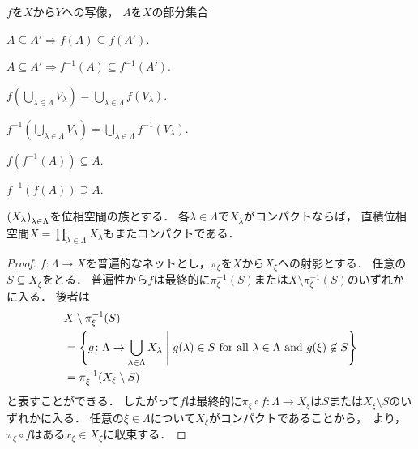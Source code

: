 \documentclass{ltjsbook}
\begin{document}
\begin{thmbox}
\begin{proposition}
\(f\)を\(X\)から\(Y\)への写像，
\(A\)を\(X\)の部分集合
\begin{conditions}
    \item\label{f-increase} \(A \subseteq A' \Rightarrow f(A) \subseteq f(A')\).
    \item\label{f-inv-increase} \(A \subseteq A' \Rightarrow f^{-1}(A) \subseteq f^{-1}(A')\).
    \item\label{f-cup} \(
        f \left(\bigcup_{\lambda \in \Lambda} V_\lambda \right)
        = \bigcup_{\lambda \in \Lambda} f(V_\lambda)
        \).
    \item\label{f-inv-cup} \(
        f^{-1} \left(\bigcup_{\lambda \in \Lambda} V_\lambda \right)
        = \bigcup_{\lambda \in \Lambda} f^{-1}(V_\lambda)
        \).
    \item\label{f-f-inv-a} \(f(f^{-1}(A)) \subseteq A\).
    \item\label{f-inv-f-a} \(f^{-1}(f(A)) \supseteq A\).
\end{conditions}
\end{proposition}
\end{thmbox}

\begin{thmbox}
\begin{theorem}[（Tikhonovの定理）]
\({({X}_\lambda)}_{\lambda \in \Lambda}\)を位相空間の族とする．
各\(\lambda \in \Lambda\)で\(X_\lambda\)がコンパクトならば，
直積位相空間\(X = \prod_{\lambda \in \Lambda} X_\lambda\)もまたコンパクトである．
\end{theorem}
\end{thmbox}

\begin{proof}
\(f\colon \Lambda \to X\)を普遍的なネットとし，\(\pi_\xi\)を\(X\)から\(X_\xi\)への射影とする．
任意の\(S \subseteq X_\xi\)をとる．
普遍性から\(f\)は最終的に\(\pi_\xi^{-1}(S)\)または\(X \setminus \pi_\xi^{-1}(S)\)のいずれかに入る．
後者は
\begin{align*}
    & X \setminus \pi_\xi^{-1}(S) \\
    & = \left\{
        g \colon \Lambda \to \bigcup_{\lambda \in \Lambda} X_\lambda
        \mathrel{}\middle|\mathrel{}
        g(\lambda) \in S \text{ for all } \lambda \in \Lambda \text{ and }
        g(\xi) \not\in S
    \right\} \\
    &= \pi_{\xi}^{-1}(X_\xi \setminus S)
\end{align*}
と表すことができる．
したがって\(f\)は最終的に\(\pi_\xi \circ f \colon \Lambda \to X_\xi\)は\(S\)または\(X_\xi \setminus S\)のいずれかに入る．
任意の\(\xi \in \Lambda\)について\(X_\xi\)がコンパクトであることから，~より，\(\pi_\xi \circ f\)はある\(x_\xi \in X_\xi\)に収束する．
\end{proof}
\end{document}
